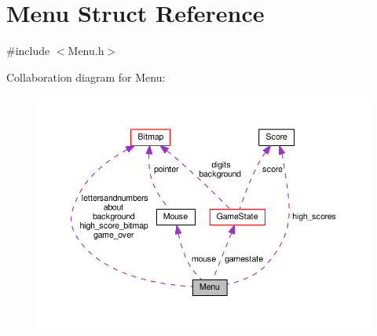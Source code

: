 \hypertarget{structMenu}{}\section{Menu Struct Reference}
\label{structMenu}


{\ttfamily \#include $<$Menu.\+h$>$}



Collaboration diagram for Menu\+:
\nopagebreak
\begin{figure}[H]
\begin{center}
\leavevmode
\includegraphics[width=350pt]{structMenu__coll__graph}
\end{center}
\end{figure}

